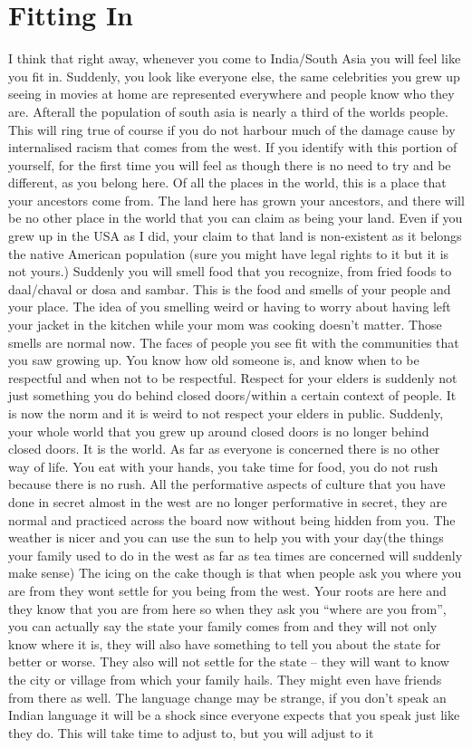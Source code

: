 \chapter{Fitting In}
I think that right away, whenever you come to India/South Asia you will feel like you fit in. Suddenly, you look like everyone else, the same celebrities you grew up seeing in movies at home are represented everywhere and people know who they are. Afterall the population of south asia is nearly a third of the worlds people. This will ring true of course if you do not harbour much of the damage cause by internalised racism that comes from the west. If you identify with this portion of yourself, for the first time you will feel as though there is no need to try and be different, as you belong here. Of all the places in the world, this is a place that your ancestors come from. The land here has grown your ancestors, and there will be no other place in the world that you can claim as being your land. Even if you grew up in the USA as I did, your claim to that land is non-existent as it belongs the native American population (sure you might have legal rights to it but it is not yours.) Suddenly you will smell food that you recognize, from fried foods to daal/chaval or dosa and sambar. This is the food and smells of your people and your place. The idea of you smelling weird or having to worry about having left your jacket in the kitchen while your mom was cooking doesn’t matter. Those smells are normal now. The faces of people you see fit with the communities that you saw growing up. You know how old someone is, and know when to be respectful and when not to be respectful. Respect for your elders is suddenly not just something you do behind closed doors/within a certain context of people. It is now the norm and it is weird to not respect your elders in public. Suddenly, your whole world that you grew up around closed doors is no longer behind closed doors. It is the world. As far as everyone is concerned there is no other way of life. You eat with your hands, you take time for food, you do not rush because there is no rush. All the performative aspects of culture that you have done in secret almost in the west are no longer performative in secret, they are normal and practiced across the board now without being hidden from you. The weather is nicer and you can use the sun to help you with your day(the things your family used to do in the west as far as tea times are concerned will suddenly make sense) The icing on the cake though is that when people ask you where you are from they wont settle for you being from the west. Your roots are here and they know that you are from here so when they ask you “where are you from”, you can actually say the state your family comes from and they will not only know where it is, they will also have something to tell you about the state for better or worse. They also will not settle for the state – they will want to know the city or village from which your family hails. They might even have friends from there as well. The language change may be strange, if you don’t speak an Indian language it will be a shock since everyone expects that you speak just like they do. This will take time to adjust to, but you will adjust to it 